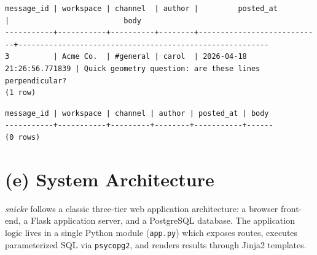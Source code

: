 \documentclass[11pt,letterpaper]{article}
\begin{document}
\begin{lstlisting}[style=result]
message_id | workspace | channel  | author |         posted_at          |                          body
-----------+-----------+----------+--------+----------------------------+---------------------------------------------------------
3          | Acme Co.  | #general | carol  | 2026-04-18 21:26:56.771839 | Quick geometry question: are these lines perpendicular?
(1 row)
\end{lstlisting}

\begin{lstlisting}[style=result]
message_id | workspace | channel | author | posted_at | body
-----------+-----------+---------+--------+-----------+------
(0 rows)
\end{lstlisting}

\section*{(e) System Architecture}

\emph{snickr} follows a classic three-tier web application architecture:
a browser front-end, a Flask application server, and a PostgreSQL database.
The application logic lives in a single Python module (\texttt{app.py}) which
exposes routes, executes parameterized SQL via \texttt{psycopg2}, and renders
results through Jinja2 templates.
\end{document}
